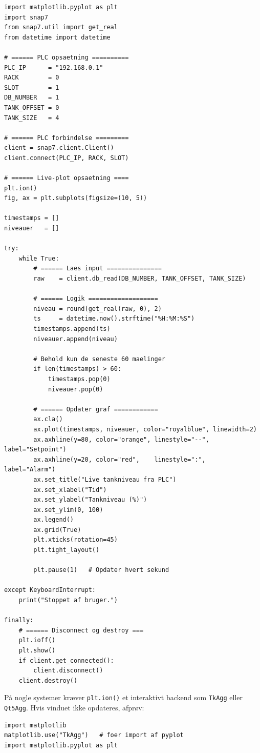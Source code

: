 \documentclass[12pt, a4paper]{article}
\begin{document}
\begin{tcolorbox}[pythonbox, title={\faPython\quad Kode 5 --- Live-plot fra PLC (snap7 + plt.ion())}]
\begin{verbatim}
import matplotlib.pyplot as plt
import snap7
from snap7.util import get_real
from datetime import datetime

# ====== PLC opsaetning ==========
PLC_IP      = "192.168.0.1"
RACK        = 0
SLOT        = 1
DB_NUMBER   = 1
TANK_OFFSET = 0
TANK_SIZE   = 4

# ====== PLC forbindelse =========
client = snap7.client.Client()
client.connect(PLC_IP, RACK, SLOT)

# ====== Live-plot opsaetning ====
plt.ion()
fig, ax = plt.subplots(figsize=(10, 5))

timestamps = []
niveauer   = []

try:
    while True:
        # ====== Laes input ===============
        raw    = client.db_read(DB_NUMBER, TANK_OFFSET, TANK_SIZE)

        # ====== Logik ===================
        niveau = round(get_real(raw, 0), 2)
        ts     = datetime.now().strftime("%H:%M:%S")
        timestamps.append(ts)
        niveauer.append(niveau)

        # Behold kun de seneste 60 maelinger
        if len(timestamps) > 60:
            timestamps.pop(0)
            niveauer.pop(0)

        # ====== Opdater graf ============
        ax.cla()
        ax.plot(timestamps, niveauer, color="royalblue", linewidth=2)
        ax.axhline(y=80, color="orange", linestyle="--", label="Setpoint")
        ax.axhline(y=20, color="red",    linestyle=":",  label="Alarm")
        ax.set_title("Live tankniveau fra PLC")
        ax.set_xlabel("Tid")
        ax.set_ylabel("Tankniveau (%)")
        ax.set_ylim(0, 100)
        ax.legend()
        ax.grid(True)
        plt.xticks(rotation=45)
        plt.tight_layout()

        plt.pause(1)   # Opdater hvert sekund

except KeyboardInterrupt:
    print("Stoppet af bruger.")

finally:
    # ====== Disconnect og destroy ===
    plt.ioff()
    plt.show()
    if client.get_connected():
        client.disconnect()
    client.destroy()
\end{verbatim}
\end{tcolorbox}

\begin{tcolorbox}[warnbox, title={\faExclamationTriangle\quad OBS --- Vinduesstyring}]
På nogle systemer kræver \texttt{plt.ion()} et interaktivt backend som
\texttt{TkAgg} eller \texttt{Qt5Agg}. Hvis vinduet ikke opdateres, afprøv:
\begin{verbatim}
import matplotlib
matplotlib.use("TkAgg")   # foer import af pyplot
import matplotlib.pyplot as plt
\end{verbatim}
\end{tcolorbox}
\end{document}
